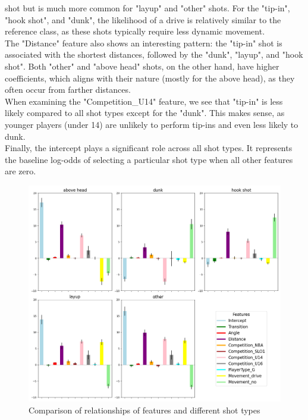 \documentclass[9pt]{IEEEtran}
\begin{document}
     shot but is much more common for "layup" and "other" shots. For the "tip-in", "hook shot", 
     and "dunk", the likelihood of a drive is relatively similar to the reference class, as these
      shots typically require less dynamic movement.\\
The "Distance" feature also shows an interesting pattern: the "tip-in" shot is associated with 
the shortest distances, followed by the "dunk", "layup", and "hook shot". Both "other" and 
"above head" shots, on the other hand, have higher coefficients, which aligns with their nature 
(mostly for the above head), as they often occur from farther distances.\\
When examining the "Competition\_U14" feature, we see that "tip-in" is less likely compared
 to all shot types except for the "dunk". This makes sense, as younger players (under 14) are 
 unlikely to perform tip-ins and even less likely to dunk.\\
Finally, the intercept plays a significant role across all shot types. It represents the 
baseline log-odds of selecting a particular shot type when all other features are zero. 


\begin{figure}[h]
    \centering
    \includegraphics[width=0.99\columnwidth]{figures/betas.png}
    \caption{Comparison of relationships of features and different shot types}
    \label{fig:betas}
\end{figure}
\end{document}
